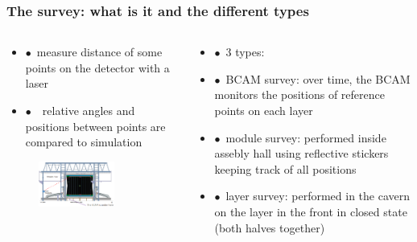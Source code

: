 \documentclass[aspectratio=1610, 12pt]{beamer}
\begin{document}
\begin{frame}\frametitle{The survey: what is it and the different types}
  \begin{columns}
    \begin{column}[c]{0.48\textwidth}
      \begin{itemize}
        \item $\bullet$\, measure distance of some points on the detector with a laser
        \item $\bullet$\, \to\, relative angles and positions between points are compared to simulation
      \end{itemize}
      \begin{figure}
        \centering
        \includegraphics[width=0.7\textwidth]{logos/survey.png}
      \end{figure}
    \end{column}
    \begin{column}[c]{0.48\textwidth}
      \begin{itemize}
          \item $\bullet$\, 3 types:
          \item $\bullet$\, BCAM survey: over time, the BCAM monitors the positions of reference points on each layer
          \item $\bullet$\, module survey: performed inside assebly hall using reflective stickers keeping track of all positions
          \item $\bullet$\, layer survey: performed in the cavern on the layer in the front in closed state (both halves together)
      \end{itemize}
    \end{column}
  \end{columns}
\end{frame}
\end{document}
